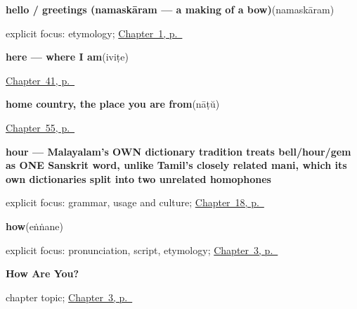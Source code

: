 \noindent\begin{minipage}[t]{\linewidth}
\raggedright
\textbf{hello / greetings (namaskāram — a making of a bow)}\enspace\emph{}\enspace(namaskāram)\par
\footnotesize explicit focus: etymology; \hyperref[ch:greetings]{Chapter~1, p.~\pageref*{ch:greetings}}
\end{minipage}\par\smallskip

\noindent\begin{minipage}[t]{\linewidth}
\raggedright
\textbf{here — where I am}\enspace\emph{}\enspace(iviṭe)\par
\footnotesize \hyperref[ch:ml-pointing-and-asking]{Chapter~41, p.~\pageref*{ch:ml-pointing-and-asking}}
\end{minipage}\par\smallskip

\noindent\begin{minipage}[t]{\linewidth}
\raggedright
\textbf{home country, the place you are from}\enspace\emph{}\enspace(nāṭŭ)\par
\footnotesize \hyperref[ch:ml-ground-underfoot]{Chapter~55, p.~\pageref*{ch:ml-ground-underfoot}}
\end{minipage}\par\smallskip

\noindent\begin{minipage}[t]{\linewidth}
\raggedright
\textbf{hour — Malayalam's OWN dictionary tradition treats bell/hour/gem as ONE Sanskrit word, unlike Tamil's closely related mani, which its own dictionaries split into two unrelated homophones}\enspace\emph{}\par
\footnotesize explicit focus: grammar, usage and culture; \hyperref[ch:ml-telling-time]{Chapter~18, p.~\pageref*{ch:ml-telling-time}}
\end{minipage}\par\smallskip

\noindent\begin{minipage}[t]{\linewidth}
\raggedright
\textbf{how}\enspace\emph{}\enspace(eṅṅane)\par
\footnotesize explicit focus: pronunciation, script, etymology; \hyperref[ch:responding]{Chapter~3, p.~\pageref*{ch:responding}}
\end{minipage}\par\smallskip

\noindent\begin{minipage}[t]{\linewidth}
\raggedright
\textbf{How Are You?}\par
\footnotesize chapter topic; \hyperref[ch:responding]{Chapter~3, p.~\pageref*{ch:responding}}
\end{minipage}\par\smallskip

